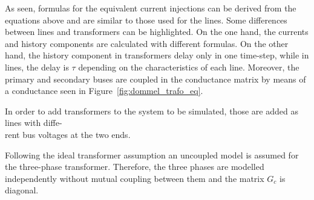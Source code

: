 As seen, formulas for the equivalent current injections can be derived from the equations above and are similar to those used for the lines. 
Some differences between lines and transformers can be highlighted. On the one hand, the currents and history components are calculated with different formulas.
On the other hand, the history component in transformers
delay only in one time-step, while in lines, the delay is $\tau$ depending on the characteristics of each line.
Moreover, the primary and secondary buses are coupled in the conductance matrix by means of a conductance seen in Figure~\ref{fig:dommel_trafo_eq}.

In order to add transformers to the system to be simulated, those are added as lines with diffe-\\rent bus voltages at the two ends.

Following the ideal transformer assumption an uncoupled model is assumed for the three-phase transformer. Therefore, the three phases are modelled independently 
without mutual coupling between them and the matrix $G_c$ is diagonal.





